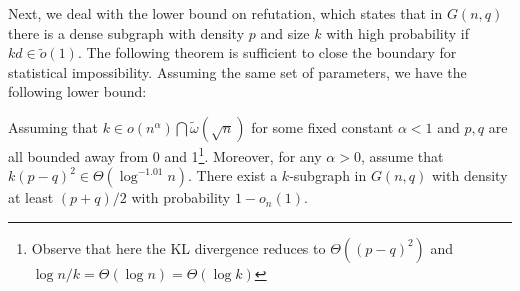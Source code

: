 \documentclass[final,12pt]{colt2023} %
\newcommand\1[1]{\mathbb{I}_{\left\{#1\right\}}}
\begin{document}
Next, we deal with the lower bound on refutation, which states that in $G(n, q)$ there is a dense subgraph with density $p$ and size $k$ with high probability if $kd\in\tilde o(1)$. The following theorem is sufficient to close the boundary for statistical impossibility. Assuming the same set of parameters, we have the following lower bound:
\begin{theorem}
Assuming that $k\in o({n}^{\alpha})\bigcap \tilde{\omega}(\sqrt{n})$ for some fixed constant $\alpha<1$ and $p, q$ are all bounded away from 0 and 1\footnote{Observe that here the KL divergence reduces to $\Theta((p-q)^2)$ and $\log n/k=\Theta(\log n)=\Theta(\log k)$}. Moreover, for any $\alpha>0$, assume that $k(p-q)^2\in  \Theta(\log^{-1.01} n)$. There exist a $k$-subgraph in $G(n, q)$ with density at least $(p+q)/2$ with probability $1-o_n(1)$.
\end{theorem}
\end{document}
